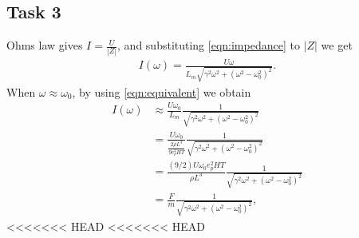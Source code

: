 \documentclass[12pt]{article}
\begin{document}
\subsection{Task 3}
Ohms law gives $I = \frac{U}{|Z|}$, and substituting \ref{eqn:impedance} to $|Z|$ we get
\begin{align}
	I(\omega) = \frac{U\omega}{L_m\sqrt{\gamma^2\omega^2 +\left(\omega^2 - \omega_0^2\right)^2}}.
\end{align}
When $\omega \approx \omega_0$, by using \eqref{eqn:equivalent} we obtain
\begin{align*}
	I(\omega) &\approx \frac{U\omega_0}{L_m}\frac{1}{\sqrt{\gamma^2\omega^2 +\left(\omega^2 - \omega_0^2\right)^2}}\\
	&=\frac{U\omega_0}{\frac{2\rho L^3}{9e_p^2HT}}\frac{1}{\sqrt{\gamma^2\omega^2 +\left(\omega^2 - \omega_0^2\right)^2}}\\
	&=\frac{(9/2)U\omega_0e_p^2HT}{\rho L^3}\frac{1}{\sqrt{\gamma^2\omega^2 +\left(\omega^2 - \omega_0^2\right)^2}}\\
	&=\frac{F}{m}\frac{1}{\sqrt{\gamma^2\omega^2 +\left(\omega^2 - \omega_0^2\right)^2}},
\end{align*}
<<<<<<< HEAD
<<<<<<< HEAD
\end{document}
